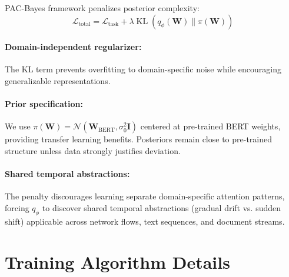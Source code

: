 \documentclass[12pt,a4paper]{article}
\theoremstyle{definition}
\DeclareMathOperator{\KL}{KL}
\begin{document}
PAC-Bayes framework penalizes posterior complexity:
\begin{equation}
\mathcal{L}_{\text{total}} = \mathcal{L}_{\text{task}} + \lambda \KL(q_\phi(\bm{W}) \| \pi(\bm{W}))
\end{equation}

\paragraph{Domain-independent regularizer:} The KL term prevents overfitting to domain-specific noise while encouraging generalizable representations.

\paragraph{Prior specification:} We use $\pi(\bm{W}) = \mathcal{N}(\bm{W}_{\text{BERT}}, \sigma_0^2 \bm{I})$ centered at pre-trained BERT weights, providing transfer learning benefits. Posteriors remain close to pre-trained structure unless data strongly justifies deviation.

\paragraph{Shared temporal abstractions:} The penalty discourages learning separate domain-specific attention patterns, forcing $q_\phi$ to discover shared temporal abstractions (gradual drift vs. sudden shift) applicable across network flows, text sequences, and document streams.

\section{Training Algorithm Details}
\label{app:training_algorithm}
\end{document}
